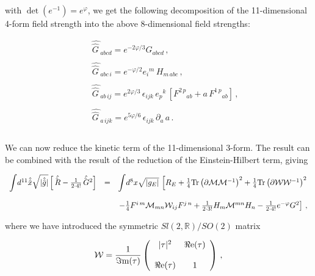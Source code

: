 \documentclass[12pt,a4paper]{article}
\begin{document}
\noindent with $\det(e^{-1})=e^{\varphi}$, we get the following 
decomposition of the 11-dimensional 4-form field strength
into the above 8-dimensional field strengths:

\begin{equation}
\label{eq:3formfieldstrength}
\begin{array}{rcl}
&& \hat{\hat{G} \,}_{abcd} = 
e^{-2\varphi/3} G_{abcd}\, ,\\
 & & \\
&& \hat{\hat{G} \,}_{abc\, i} = 
e^{-\varphi/2} e_{i}{}^{m}\, H_{m\, abc}\, , \\
 & & \\
&& \hat{\hat{G} \,}_{ab\, ij} = 
e^{2\varphi/3}\, \epsilon_{ijk}\, e_{p}{}^{k}\,
\left[ F^{2\, p}{}_{ab} + a\, F^{1\, p}{}_{ab} \right]\, , \\
 & & \\
&& \hat{\hat{G} \,}_{a\, ijk} = 
e^{5\varphi/6}\, \epsilon_{ijk}\, \partial_{a}\, a\, .\\
 & & \\
\end{array}
\end{equation}

We can now reduce the kinetic term of the 11-dimensional 3-form. The
result can be combined with the result of the reduction of the
Einstein-Hilbert term, giving

\begin{equation}
\begin{array}{rcl}
{\displaystyle\int} d^{11} \hat{\hat{x}} \sqrt{|\hat{\hat{g}}|}
 \left[ \hat{\hat{R} \,} -\frac{1}{2 \cdot 4!}\hat{\hat{G}\,}{}^{2} \right]
& = & {\displaystyle\int} d^{8}x \sqrt{|g_{E}|}\,
\left[ 
R_{E} 
+\frac{1}{4}{\rm Tr}\left(\partial {\cal M}{\cal M}^{-1}\right)^{2}
+\frac{1}{4}{\rm Tr}\left(\partial {\cal W}{\cal W}^{-1}\right)^{2}
 \right.\\
& & \\
& & 
\left.
-\frac{1}{4}F^{i\, m}{\cal M}_{mn}{\cal W}_{ij} F^{j\, n}
+\frac{1}{2\cdot 3!} H_{m}{\cal M}^{mn} H_{n}
-\frac{1}{2\cdot 4!} e^{-\varphi} G^{2} \right]\, ,\\
 \end{array}
\end{equation}

\noindent where we have introduced the symmetric 
$Sl(2,\mathbb{R})/SO(2)$ matrix

\begin{equation}
{\cal W}
=\frac{1}{\Im{\rm m}(\tau)}
\left(
\begin{array}{cc}
|\tau|^{2} &    \Re{\rm e}(\tau)  \\
& \\
\Re{\rm e}(\tau)    &  1          \\
\end{array}
\right)\, ,
\end{equation}
\end{document}

